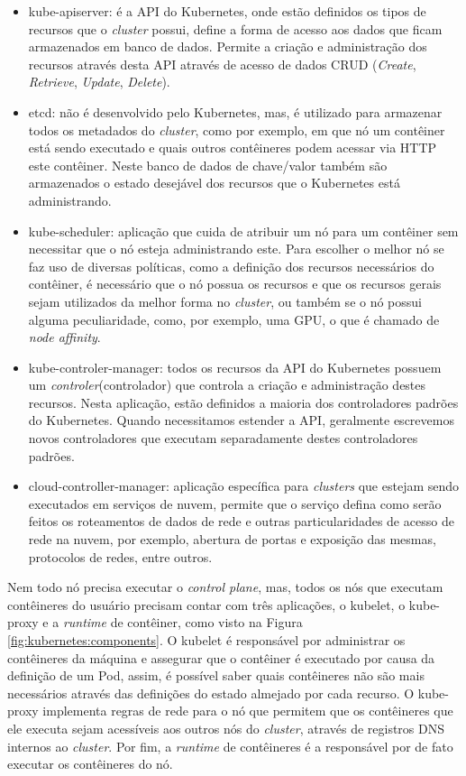 \begin{itemize}
    \item kube-apiserver: é a API do Kubernetes, onde estão definidos os tipos
    de recursos que o \textit{cluster} possui, define a forma de acesso aos
    dados que ficam armazenados em banco de dados. Permite a criação e administração
    dos recursos através desta API através de acesso de dados CRUD (\textit{Create},
    \textit{Retrieve}, \textit{Update}, \textit{Delete}).
    \item etcd: não é desenvolvido pelo Kubernetes, mas, é utilizado para armazenar
    todos os metadados do \textit{cluster}, como por exemplo, em que nó um
    contêiner está sendo executado e quais outros contêineres podem acessar via
    HTTP este contêiner. Neste banco de dados de chave/valor também são armazenados
    o estado desejável dos recursos que o Kubernetes está administrando.
    \item kube-scheduler: aplicação que cuida de atribuir um nó para um contêiner
    sem necessitar que o nó esteja administrando este. Para escolher o melhor nó
    se faz uso de diversas políticas, como a definição dos recursos necessários
    do contêiner, é necessário que o nó possua os recursos e que os recursos gerais
    sejam utilizados da melhor forma no \textit{cluster}, ou também se o nó possui
    alguma peculiaridade, como, por exemplo, uma GPU, o que é chamado de
    \textit{node affinity}.
    \item kube-controler-manager: todos os recursos da API do Kubernetes possuem
    um \textit{controler}(controlador) que controla a criação e administração
    destes recursos. Nesta aplicação, estão definidos a maioria dos controladores
    padrões do Kubernetes. Quando necessitamos estender a API, geralmente escrevemos
    novos controladores que executam separadamente destes controladores padrões.
    \item cloud-controller-manager: aplicação específica para \textit{clusters}
    que estejam sendo executados em serviços de nuvem, permite que o serviço defina
    como serão feitos os roteamentos de dados de rede e outras particularidades de
    acesso de rede na nuvem, por exemplo, abertura de portas e exposição das mesmas,
    protocolos de redes, entre outros.
\end{itemize}

Nem todo nó precisa executar o \textit{control plane}, mas, todos os nós que
executam contêineres do usuário precisam contar com três aplicações, o kubelet,
o kube-proxy e a \textit{runtime} de contêiner, como visto na Figura
\ref{fig:kubernetes:components}. O kubelet é responsável por administrar os
contêineres da máquina e assegurar que o contêiner é executado por causa da
definição de um Pod, assim, é possível saber quais contêineres não são mais
necessários através das definições do estado almejado por cada recurso. O
kube-proxy implementa regras de rede para o nó que permitem que os contêineres
que ele executa sejam acessíveis aos outros nós do \textit{cluster}, através
de registros DNS internos ao \textit{cluster}. Por fim, a \textit{runtime} de
contêineres é a responsável por de fato executar os contêineres do nó.

